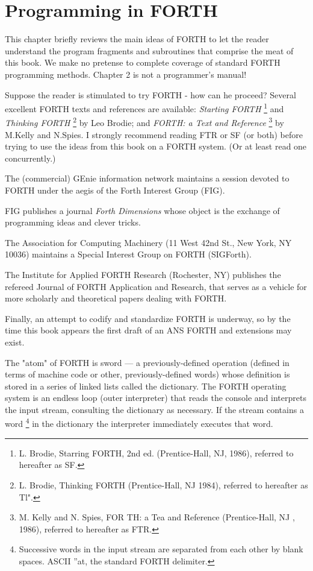 ﻿\chapter{Programming in FORTH}

This chapter brieﬂy reviews the main ideas of FORTH to let the reader understand the program fragments and subroutines that comprise the meat of this book. We make no pretense to complete coverage of standard FORTH programming methods. Chapter 2 is not a programmer’s manual!

Suppose the reader is stimulated to try FORTH - how can he proceed? Several excellent FORTH texts and references are available: \textit{Starting FORTH} \footnote{L. Brodie, Starring FORTH, 2nd ed. (Prentice-Hall, NJ, 1986), referred to hereafter as SF.} and \textit{Thinking FORTH} \footnote{L. Brodie, Thinking FORTH (Prentice-Hall, NJ 1984), referred to hereafter as Tl".} by Leo Brodie; and \textit{ FORTH: a Text and Reference} \footnote{M. Kelly and N. Spies, FOR TH: a Tea and Reference (Prentice-Hall, NJ , 1986), referred to hereafter as FTR.} by M.Kelly and N.Spies. I strongly recommend reading FTR or SF (or both) before trying to use the ideas from this book on a FORTH system. (Or at least read one concurrently.)

The (commercial) GEnie information network maintains a session devoted to FORTH under the aegis of the Forth Interest Group (FIG).

FIG publishes a journal \textit{Forth Dimensions} whose object is the exchange of programming ideas and clever tricks.

The Association for Computing Machinery (11 West 42nd St., New York, NY 10036) maintains a Special Interest Group on FORTH (SIGForth).

The Institute for Applied FORTH Research (Rochester, NY) publishes the refereed Journal of FORTH Application and Research, that serves as a vehicle for more scholarly and theoretical
papers dealing with FORTH.

Finally, an attempt to codify and standardize FORTH is underway, so by the time this book appears the ﬁrst draft of an ANS FORTH and extensions may exist.


The "atom" of FORTH is sword — a previously-deﬁned operation (deﬁned in terms of machine code or other, previously-deﬁned words) whose definition is stored in a series of linked lists called the dictionary. The FORTH operating system is an endless loop (outer interpreter) that reads the console and interprets the input stream, consulting the dictionary as necessary. If the stream contains a word \footnote{Successive words in the input stream are separated from each other by blank spaces. ASCII ”at, the standard FORTH delimiter.} in the dictionary the interpreter immediately
executes that word.

